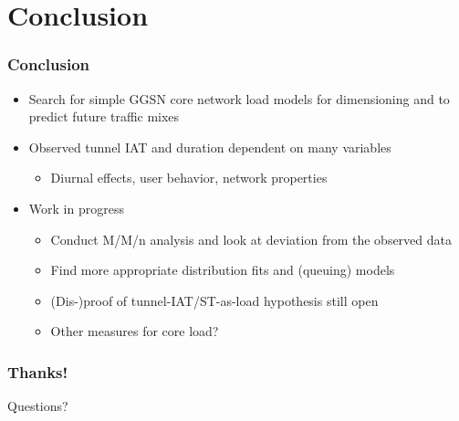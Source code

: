 \documentclass{beamer}
\begin{document}
\section{Conclusion}

\begin{frame}
	\frametitle{Conclusion}

	\begin{itemize}
		\item Search for simple GGSN core network load models for dimensioning and to predict future traffic mixes

		\item Observed tunnel IAT and duration dependent on many variables 
		\begin{itemize}
			\item Diurnal effects, user behavior, network properties
		\end{itemize}

		\item Work in progress
		\begin{itemize}
			\item Conduct M/M/n analysis and look at deviation from the observed data
			\item Find more appropriate distribution fits and (queuing) models
			\item (Dis-)proof of tunnel-IAT/ST-as-load hypothesis still open
			\item Other measures for core load?
		\end{itemize}

	\end{itemize}

\end{frame}





\begin{frame}
	\frametitle{Thanks!}

	\centering
		\Large Questions?
\end{frame}
\end{document}
